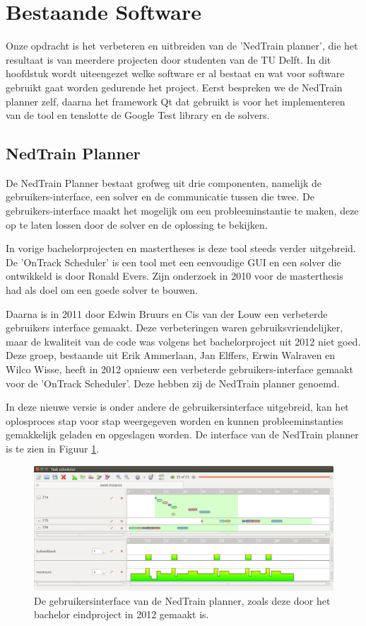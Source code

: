 \section{Bestaande Software}
Onze opdracht is het verbeteren en uitbreiden van de 'NedTrain planner', die het resultaat is van meerdere projecten door studenten van de TU Delft. In dit hoofdstuk wordt uiteengezet welke software er al bestaat en wat voor software gebruikt gaat worden gedurende het project. Eerst bespreken we de NedTrain planner zelf, daarna het framework Qt dat gebruikt is voor het implementeren van de tool en tenslotte de Google Test library en de solvers.

\subsection{NedTrain Planner}
\label{subsec:planner}
De NedTrain Planner bestaat grofweg uit drie componenten, namelijk de gebruikers-interface, een solver en de communicatie tussen die twee. De gebruikers-interface maakt het mogelijk om een probleeminstantie te maken, deze op te laten lossen door de solver en de oplossing te bekijken.

In vorige bachelorprojecten en mastertheses is deze tool steeds verder uitgebreid. De 'OnTrack Scheduler' is een tool met een eenvoudige GUI en een solver die ontwikkeld is door Ronald Evers. Zijn onderzoek in 2010 voor de masterthesis had als doel om een goede solver te bouwen. \cite{ronaldevers2010}

Daarna is in 2011 door Edwin Bruurs en Cis van der Louw een verbeterde gebruikers interface gemaakt. \cite{bep2011nedtrain} Deze verbeteringen waren gebruiksvriendelijker, maar de kwaliteit van de code was volgens het bachelorproject uit 2012 niet goed. \cite{bep2012nedtrain} Deze groep, bestaande uit Erik Ammerlaan, Jan Elffers, Erwin Walraven en Wilco Wisse, heeft in 2012 opnieuw een verbeterde gebruikers-interface gemaakt voor de 'OnTrack Scheduler'. Deze hebben zij de NedTrain planner genoemd.

In deze nieuwe versie is onder andere de gebruikersinterface uitgebreid, kan het oplosproces stap voor stap weergegeven worden en kunnen probleeminstanties gemakkelijk geladen en opgeslagen worden. De interface van de NedTrain planner is te zien in Figuur \ref{fig:plannergui}.

\begin{figure}[!h]
\label{fig:plannergui}
\centering
\includegraphics[width=\textwidth]{../images/plannergui.png}
\caption{De gebruikersinterface van de NedTrain planner, zoals deze door het bachelor eindproject in 2012 gemaakt is.}
\end{figure}


